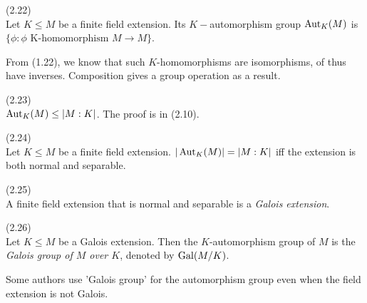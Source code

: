 \documentclass[a4paper]{article}
\begin{document}
\begin{defi} (2.22)\\
Let $K \leq M$ be a finite field extension. Its $K-$automorphism group $\operatorname{Aut}_K(M)$ is $\{\phi: \phi \text{ K-homomorphism } M \to M\}$.
\end{defi}

From (1.22), we know that such $K$-homomorphisms are isomorphisms, of thus have inverses. Composition gives a group operation as a result.

\begin{lemma} (2.23)\\
$\operatorname{Aut}_K(M) \leq |M:K|$. The proof is in (2.10).
\end{lemma}

\begin{thm} (2.24)\\
Let $K \leq M$ be a finite field extension. $|\operatorname{Aut}_K(M)| = |M:K|$ iff the extension is both normal and separable.
\end{thm}

\begin{defi}(2.25)\\
A finite field extension that is normal and separable is a \emph{Galois extension}.
\end{defi}

\begin{defi}(2.26)\\
Let $K \leq M$ be a Galois extension. Then the $K$-automorphism group of $M$ is the \emph{Galois group of $M$ over $K$}, denoted by $\operatorname{Gal}(M/K)$.
\end{defi}

\begin{rem}
Some authors use 'Galois group' for the automorphism group even when the field extension is not Galois.
\end{rem}
\end{document}

